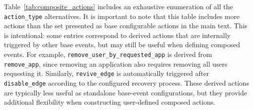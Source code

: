 \documentclass[ASNA]{USG} %
\begin{document}
Table~\ref{tab:composite_actions} includes an exhaustive enumeration of all the \texttt{action\_type} alternatives. It is important to note that this table includes more actions than the set presented as base configurable actions in the main text. This is intentional: some entries correspond to derived actions that are internally triggered by other base events, but may still be useful when defining composed events. For example, \texttt{remove\_user\_by\_requested\_app} is derived from \texttt{remove\_app}, since removing an application also requires removing all users requesting it. Similarly, \texttt{revive\_edge} is automatically triggered after \texttt{disable\_edge} according to the configured recovery process. These derived actions are typically less useful as standalone base-event configurations, but they provide additional flexibility when constructing user-defined composed actions.
\end{document}
